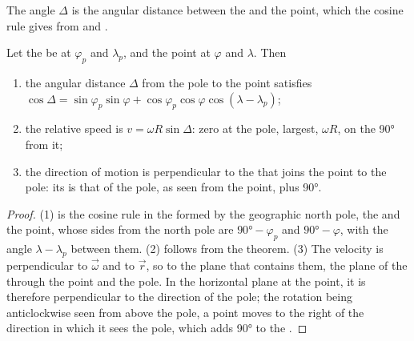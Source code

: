 The angle $\Delta$ is the angular distance between the  and the point,
which the cosine rule gives from  and .

\begin{proposition}\label{prop:b1:plate-kinematics:speed}
Let the  be at  $\varphi_p$ and  $\lambda_p$, and the
point at $\varphi$ and $\lambda$. Then
\begin{enumerate}
  \item the angular distance $\Delta$ from the pole to the point satisfies
        $\cos\Delta = \sin\varphi_p\sin\varphi + \cos\varphi_p\cos\varphi
        \cos(\lambda - \lambda_p)$;
  \item the relative speed is $v = \omega R\sin\Delta$: zero at the pole,
        largest, $\omega R$, on the  \ang{90} from it;
  \item the direction of motion is perpendicular to the  that joins
        the point to the pole: its  is that of the pole, as seen from
        the point, plus \ang{90}.
\end{enumerate}
\end{proposition}

\begin{proof}
(1) is the cosine rule in the  formed by the geographic north
pole, the  and the point, whose sides from the north pole are
$\ang{90} - \varphi_p$ and $\ang{90} - \varphi$, with the angle
$\lambda - \lambda_p$ between them. (2) follows from the theorem. (3) The
velocity is perpendicular to $\vec\omega$ and to $\vec r$, so to the plane that
contains them, the plane of the  through the point and the pole. In
the horizontal plane at the point, it is therefore perpendicular to the
direction of the pole; the rotation being anticlockwise seen from above the
pole, a point moves to the right of the direction in which it sees the pole,
which adds \ang{90} to the .
\end{proof}

